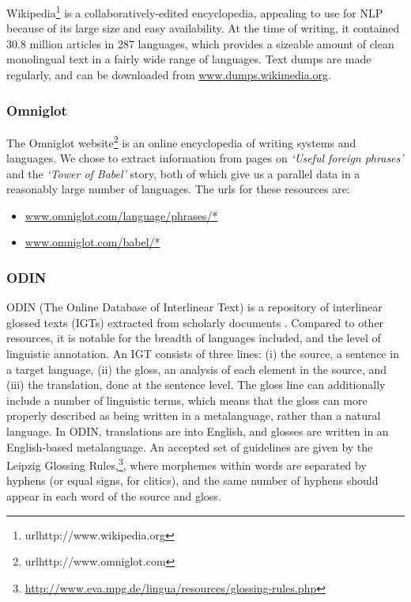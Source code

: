 Wikipedia\footnote{url{http://www.wikipedia.org}} is a collaboratively-edited encyclopedia, appealing to use for NLP because of its large size and easy availability. At the time of writing, it contained 30.8 million articles in 287 languages, which provides a sizeable amount of clean monolingual text in a fairly wide range of languages. Text dumps are made regularly, and can be downloaded from \url{www.dumps.wikimedia.org}.

\subsubsection{Omniglot}

The Omniglot website\footnote{url{http://www.omniglot.com}} is an online encyclopedia of writing systems and languages. We chose to extract information from pages on \emph{`Useful foreign phrases'} and the \emph{`Tower of Babel'} story, both of which give us a parallel data in a reasonably large number of languages. The urls for these resources are:

\begin{itemize}[noitemsep]
\item \url{www.omniglot.com/language/phrases/*} 
\item \url{www.omniglot.com/babel/*}
\end{itemize}

\subsubsection{ODIN} \label{sec:odin}

ODIN (The Online Database of Interlinear Text) is a repository of interlinear glossed texts (IGTs) extracted from scholarly documents \cite{lewis2006odin,lewis2010odin}.  Compared to other resources, it is notable for the breadth of languages included, and the level of linguistic annotation.  An IGT consists of three lines: (i) the source, a sentence in a target language, (ii) the gloss, an analysis of each element in the source, and (iii) the translation, done at the sentence level. The gloss line can additionally include a number of linguistic terms, which means that the gloss can more properly described as being written in a metalanguage, rather than a natural language.  In ODIN, translations are into English, and glosses are written in an English-based metalanguage.  An accepted set of guidelines are given by the Leipzig Glossing Rules,\footnote{\url{http://www.eva.mpg.de/lingua/resources/glossing-rules.php}}, where morphemes within words are separated by hyphens (or equal signs, for clitics), and the same number of hyphens should appear in each word of the source and gloss.

